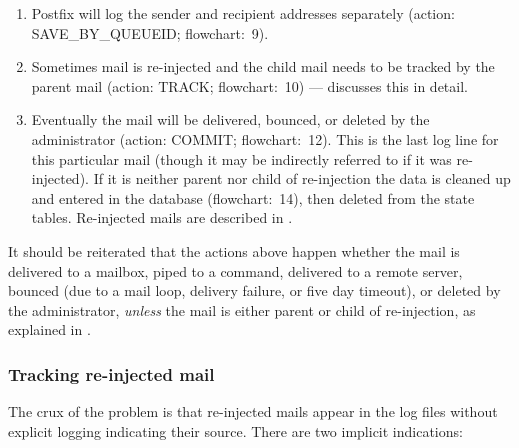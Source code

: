 \begin{enumerate}

    \item Postfix will log the sender and recipient addresses separately
        (action: SAVE\_BY\_QUEUEID\@; flowchart:~9).

    \item Sometimes mail is re-injected and the child mail needs to be
        tracked by the parent mail (action: TRACK\@; flowchart:~10) ---
         discusses this in
        detail.

    \item Eventually the mail will be delivered, bounced, or deleted by the
        administrator (action: COMMIT\@; flowchart:~12).  This is the last
        log line for this particular mail (though it may be indirectly
        referred to if it was re-injected).  If it is neither parent nor
        child of re-injection the data is cleaned up and entered in the
        database (flowchart:~14), then deleted from the state tables.
        Re-injected mails are described in .

\end{enumerate}

It should be reiterated that the actions above happen whether the mail is
delivered to a mailbox, piped to a command, delivered to a remote server,
bounced (due to a mail loop, delivery failure, or five day timeout), or
deleted by the administrator, \textit{unless\/} the mail is either parent
or child of re-injection, as explained in .

\subsubsection{Tracking re-injected mail}

\label{tracking re-injected mail}

The crux of the problem is that re-injected mails appear in the log files
without explicit logging indicating their source.  There are two implicit
indications:


